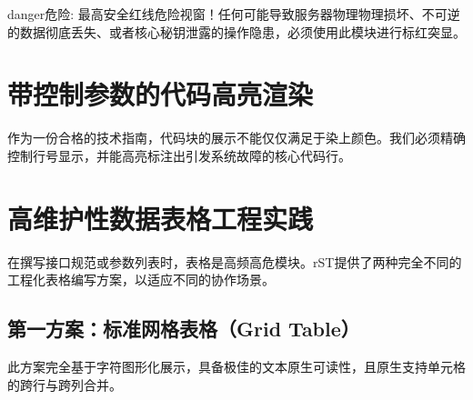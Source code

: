 \documentclass[a4paper,11pt,english]{sphinxmanual}
\begin{document}
\begin{sphinxadmonition}{danger}{危险:}
\sphinxAtStartPar
最高安全红线危险视窗！任何可能导致服务器物理物理损坏、不可逆的数据彻底丢失、或者核心秘钥泄露的操作隐患，必须使用此模块进行标红突显。
\end{sphinxadmonition}


\section{带控制参数的代码高亮渲染}
\label{\detokenize{advanced_showcase:id4}}
\sphinxAtStartPar
作为一份合格的技术指南，代码块的展示不能仅仅满足于染上颜色。我们必须精确控制行号显示，并能高亮标注出引发系统故障的核心代码行。
\def\sphinxLiteralBlockLabel{\label{\detokenize{advanced_showcase:id8}}}
%
\begin{sphinxVerbatim}[commandchars=\\\{\},numbers=left,firstnumber=1,stepnumber=1]
       
        
     \PYG{p}{[}    \PYG{p}{]}
\end{sphinxVerbatim}
\sphinxresetverbatimhllines


\section{高维护性数据表格工程实践}
\label{\detokenize{advanced_showcase:id5}}
\sphinxAtStartPar
在撰写接口规范或参数列表时，表格是高频高危模块。rST提供了两种完全不同的工程化表格编写方案，以适应不同的协作场景。


\subsection{第一方案：标准网格表格（Grid Table）}
\label{\detokenize{advanced_showcase:grid-table}}
\sphinxAtStartPar
此方案完全基于字符图形化展示，具备极佳的文本原生可读性，且原生支持单元格的跨行与跨列合并。
\end{document}
